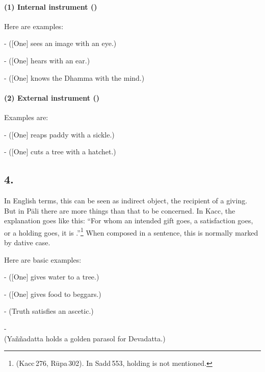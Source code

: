 \paragraph*{(1) Internal instrument ()} Here are examples:\par
-  ([One] sees an image with an eye.)\par
-  ([One] hears with an ear.)\par
-  ([One] knows the Dhamma with the mind.)\par

\paragraph*{(2) External instrument ()} Examples are:\par
-  ([One] reaps paddy with a sickle.)\par
-  ([One] cuts a tree with a hatchet.)\par

{}
\subsection*{4.\,}

In English terms, this can be seen as indirect object, the recipient of a giving. But in P\=ali there are more things than that to be concerned. In Kacc, the explanation goes like this: ``For whom an intended gift goes, a satisfaction goes, or a holding goes, it is .''\footnote{ (Kacc\,276, R\=upa\,302). In Sadd\,553, holding is not mentioned.} When composed in a sentence, this is normally marked by dative case.

Here are basic examples:\par
-  ([One] gives water to a tree.)\par
-  ([One] gives food to beggars.)\par
-  (Truth satisfies an ascetic.)\par
-  \\(Ya\~n\~nadatta holds a golden parasol for Devadatta.)\par


